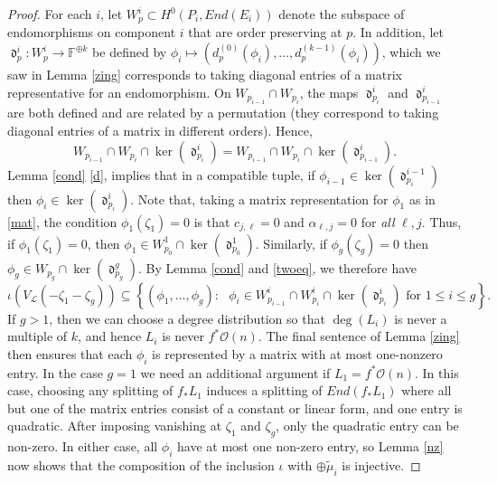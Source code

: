 \documentclass[12pt]{amsart}
\newcommand{\cc}{\mathbb{F}}
\renewcommand{\L}{\mathcal{L}}
\renewcommand{\O}{\mathscr{O}}
\renewcommand{\tilde}{\widetilde}
\DeclareMathOperator{\diag}{\mathfrak{d}}
\theoremstyle{definition}
\theoremstyle{remark}
\theoremstyle{remark}
\numberwithin{equation}{section}
\begin{document}
\begin{proof}
For each $i$, 
let $W_p^i \subset H^0(P_i, End(E_i))$ denote the subspace of endomorphisms on component $i$ that are order preserving at $p$. In addition, let $\diag^i_{p} : W_{p}^i \rightarrow \cc^{\oplus k}$ be defined by $\phi_i \mapsto (d_{p}^{(0)}(\phi_i), \ldots, d_{p}^{(k-1)}(\phi_i))$, which we saw in Lemma \ref{zing} corresponds to taking diagonal entries of a matrix representative for an endomorphism. 
On $W_{p_{i-1}} \cap W_{p_{i}}$, the maps $\diag^i_{p_i}$ and $\diag^i_{p_{i-1}}$ are both defined  and are related by a permutation (they correspond to taking diagonal entries of a matrix in different orders). Hence,
\begin{equation} \label{twoeq}
W_{p_{i-1}} \cap W_{p_{i}} \cap \ker(\diag^i_{p_i}) = W_{p_{i-1}} \cap W_{p_{i}} \cap \ker(\diag^i_{p_{i-1}}).
\end{equation}
Lemma \ref{cond} \eqref{d}, implies that in a compatible tuple, if $\phi_{i-1} \in \ker(\diag^{i-1}_{p_i})$ then $\phi_i \in \ker(\diag^i_{p_i})$.
Note that, taking a matrix representation for $\phi_1$ as in \eqref{mat}, the condition $\phi_1(\zeta_1) = 0$ is that $c_{j, \ell} = 0$ and $\alpha_{\ell, j}  = 0$ for \textit{all} $\ell, j$. Thus, if $\phi_1(\zeta_1) = 0$, then $\phi_1 \in  W_{p_0}^1 \cap \ker(\diag^1_{p_0})$. 
Similarly, if $\phi_g(\zeta_g) = 0$ then $\phi_g \in W_{p_g} \cap \ker(\diag^g_{p_g})$.
By Lemma \ref{cond} and \eqref{twoeq}, we therefore have
\begin{equation*}
\iota(V_\L(-\zeta_1-\zeta_g)) \subseteq \left\{(\phi_1, \ldots, \phi_g) : 
\text{ $\phi_i \in W_{p_{i-1}}^i \cap W_{p_i}^i \cap \ker(\diag^{i}_{p_{i}})$ for $1 \leq i \leq g$}
\right\}.
\end{equation*}
If $g > 1$, then we can choose a degree distribution so that $\deg(L_i)$ is never a multiple of $k$, and hence $L_i$ is never $f^*\O(n)$.
The final sentence of Lemma \ref{zing} then ensures that each $\phi_i$ is represented by a matrix with at most one-nonzero entry. In the case $g = 1$ we need an additional argument if $L_1 = f^*\O(n)$. In this case, choosing any splitting of $f_*L_1$ induces a splitting of $End(f_*L_1)$ where all but one of the matrix entries consist of a constant or linear form, and one entry is quadratic. After imposing vanishing at $\zeta_1$ and $\zeta_g$, only the quadratic entry can be non-zero. In either case, all $\phi_i$ have at most one non-zero entry, so Lemma \ref{nz} now shows that the composition of the inclusion $\iota$ with $\oplus \tilde{\mu}_i$ is injective.
\end{proof}
 
\end{document}

